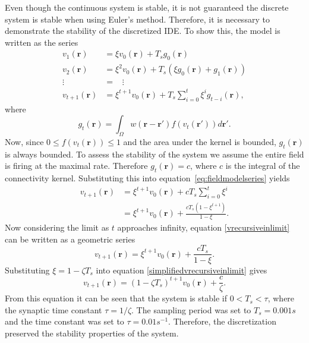 \documentclass[review,authoryear,3p]{elsarticle}
\begin{document}
Even though the continuous system is stable, it is not guaranteed the discrete system is stable when using Euler's method. Therefore, it is necessary to demonstrate the stability of the discretized IDE. To show this, the model is written as the series
\begin{align}
	v_1(\mathbf{r}) &= \xi v_0(\mathbf{r}) + T_s g_0(\mathbf{r}) \\
	v_2(\mathbf{r})	&= \xi^2 v_0(\mathbf{r}) + T_s \left(\xi g_0(\mathbf{r}) + g_1(\mathbf{r}) \right) \\
	\vdots \, \, \, \, \, &= \, \, \, \, \, \vdots \\
	v_{t+1}(\mathbf r) &= \xi^{t+1} v_0\left(\mathbf{r} \right) + T_s \sum_{i=0}^t \xi^i g_{t-i}(\mathbf{r}), \label{eq:fieldmodelseries}
\end{align}
where
\begin{equation}
	g_{t}(\mathbf{r}) = \int_\Omega { w\left(\mathbf{r}-\mathbf{r}'\right) f\left(v_t\left(\mathbf{r}'\right)\right) d\mathbf{r}'}.
\end{equation}
Now, since $0 \leq f(v_t(\mathbf r)) \leq 1$ and the area under the kernel is bounded, $g_t(\mathbf r)$ is always bounded. To assess the stability of the system  we assume the entire field is firing at the maximal rate. Therefore $g_{t}(\mathbf{r}) = c$, where $c$ is the integral of the connectivity kernel. Substituting this into equation~\ref{eq:fieldmodelseries} yields
\begin{align}\label{vrecursiveinlimit}
	v_{t+1}(\mathbf r) &= \xi^{t+1}v_0(\mathbf r)+ c T_s \sum_{i=0}^t \xi^i \nonumber \\
	&=\xi^{t+1}v_0(\mathbf r) + \frac{ c T_s(1-\xi^{t+1})}{1-\xi}.
\end{align}
Now considering the limit as $t$ approaches infinity, equation \eqref{vrecursiveinlimit} can be written as a geometric series
\begin{equation}\label{simplifiedvrecursiveinlimit}
	v_{t+1}(\mathbf r)=\xi^{t+1}v_0(\mathbf r)+\frac{c T_s}{1-\xi}.
\end{equation}
Substituting $\xi=1-\zeta T_s$ into equation \eqref{simplifiedvrecursiveinlimit} gives
\begin{equation}
	v_{t+1}(\mathbf r)=(1-\zeta T_s)^{t+1}v_0(\mathbf r)+\frac{c}{\zeta}.
\end{equation}
From this equation it can be seen that the system is stable if $0 < T_s < \tau$, where the synaptic time constant $\tau = 1/\zeta$. The sampling period was set to $T_s = 0.001 s$ and the time constant was set to $\tau = 0.01 s^{-1}$. Therefore, the discretization preserved the stability properties of the system.
\end{document}
